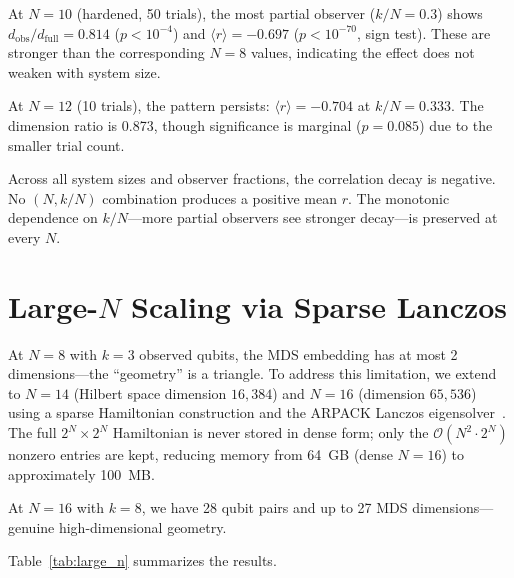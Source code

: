 \documentclass[aps,pra,twocolumn,superscriptaddress]{revtex4-2}
\begin{document}
At $N = 10$ (hardened, 50 trials), the most partial observer ($k/N = 0.3$) shows $d_\text{obs}/d_\text{full} = 0.814$ ($p < 10^{-4}$) and $\langle r \rangle = -0.697$ ($p < 10^{-70}$, sign test). These are stronger than the corresponding $N = 8$ values, indicating the effect does not weaken with system size.

At $N = 12$ (10 trials), the pattern persists: $\langle r \rangle = -0.704$ at $k/N = 0.333$. The dimension ratio is 0.873, though significance is marginal ($p = 0.085$) due to the smaller trial count.

Across all system sizes and observer fractions, the correlation decay is negative. No $(N, k/N)$ combination produces a positive mean $r$. The monotonic dependence on $k/N$---more partial observers see stronger decay---is preserved at every $N$.


\section{Large-$N$ Scaling via Sparse Lanczos}
\label{sec:large_n}

At $N = 8$ with $k = 3$ observed qubits, the MDS embedding has at most 2 dimensions---the ``geometry'' is a triangle. To address this limitation, we extend to $N = 14$ (Hilbert space dimension $16{,}384$) and $N = 16$ (dimension $65{,}536$) using a sparse Hamiltonian construction and the ARPACK Lanczos eigensolver~\cite{lehoucq1998}. The full $2^N \times 2^N$ Hamiltonian is never stored in dense form; only the $\mathcal{O}(N^2 \cdot 2^N)$ nonzero entries are kept, reducing memory from 64~GB (dense $N = 16$) to approximately 100~MB.

At $N = 16$ with $k = 8$, we have 28 qubit pairs and up to 27 MDS dimensions---genuine high-dimensional geometry.

Table~\ref{tab:large_n} summarizes the results.
\end{document}
